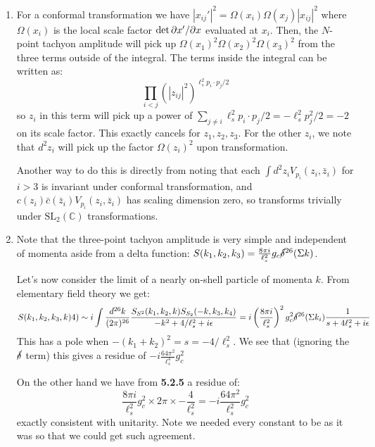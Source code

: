 \documentclass[11pt, class=article, crop=false]{standalone}
\begin{document}
\begin{enumerate}
	\item For a conformal transformation we have $|x_{ij}'|^2 = \Omega(x_i) \Omega(x_j) |x_{ij}|^2$ where $\Omega(x_i)$ is the local scale factor $\det \partial x'/\partial x$ evaluated at $x_i$. Then, the $N$-point tachyon amplitude will pick up $\Omega(x_1)^2 \Omega(x_2)^2 \Omega(x_3)^2$ from the three terms outside of the integral. The terms inside the integral can be written as:
	\[
		\prod_{i < j} (|z_{ij}|^2)^{\ell_s^2 p_i \cdot p_j/2}
	\]
	so $z_i$ in this term will pick up a power of $\sum_{j \neq i} \ell_s^2 p_i \cdot p_j/2 = -\ell_s^2 p_j^2 / 2 = -2$ on its scale factor. This exactly cancels for $z_1, z_2, z_3$. For the other $z_i$, we note that $d^2 z_i$ will pick up the factor $\Omega(z_i)^{2}$ upon transformation. 
	
	Another way to do this is directly from noting that each $\int d^2 z_i V_{p_i} (z_i, \bar z_i)$ for $i > 3$ is invariant under conformal transformation, and $c(z_i) \bar c(\bar z_i) V_{p_i}(z_i, \bar z_i)$ has scaling dimension zero, so transforms trivially under $\mathrm{SL}_2 (\mathbb C)$ transformations. 
	
	\item 
	Note that the three-point tachyon amplitude is very simple and independent of momenta aside from a delta function: $S(k_1, k_2, k_3) = \frac{8 \pi i}{\ell_s^2} g_c \cancel\delta^{26}(\Sigma k)$. 
	
	Let's now consider the limit of a nearly on-shell particle of momenta $k$. From elementary field theory we get:
	\[
		S(k_1, k_2, k_3, k)4) \sim i \int \frac{d^{26} k}{(2\pi)^{26}} \frac{S_{S^2} (k_1, k_2, k) S_{S_2} (-k, k_3, k_4)}{-k^2 + 4/\ell_s^2 + i \epsilon} = i \left(\frac{8 \pi i}{\ell_s^2}\right)^2 g_c^2 \cancel\delta^{26} (\Sigma k_i) \frac{1}{s + 4 \ell_s^2 + i \epsilon}
	\]
	This has a pole when $-(k_1 + k_2)^2 = s = -4/\ell_s^2$. We see that (ignoring the $\cancel\delta$ term) this gives a residue of $-i\frac{64 \pi^2}{\ell_s^4} g_c^2$
	
	On the other hand we have from \textbf{5.2.5} a residue of:
	\[
		\frac{8 \pi i}{\ell_s^2} g_c^2 \times 2\pi \times -\frac{4}{\ell_s^2} = - i \frac{64 \pi^2}{\ell_s^2} g_c^2
	\]
	exactly consistent with unitarity. Note we needed every constant to be as it was so that we could get such agreement. 
	

\end{enumerate}
\end{document}
